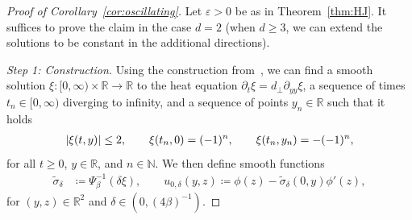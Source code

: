 \documentclass[12pt,oneside,a4paper,reqno]{amsart}
\numberwithin{equation}{section}
\theoremstyle{definition}
\theoremstyle{remark}
\newcommand{\bbN}{{\mathbb N}}
\newcommand{\bbR}{{\mathbb R}}
\DeclarePairedDelimiter{\abs}{\lvert}{\rvert}
\begin{document}
\begin{proof}[Proof of Corollary~\ref{cor:oscillating}]
    Let $\varepsilon > 0$ be as in Theorem~\ref{thm:HJ}. It suffices to prove the claim in the case $d = 2$ (when $d \geq 3$, we can extend the solutions to be constant in the additional directions).
    
    \emph{Step 1: Construction.}
    Using the construction from~\cite[\S\,3]{matano_stability_2009}, we can find a smooth solution $\xi \colon [0,\infty) \times \bbR \to \bbR$ to the heat equation $\partial_t \xi = d_{\bot} \partial_{yy}\xi$,
    a sequence of times $t_n \in [0,\infty)$ diverging to infinity, and a sequence of points $y_n \in \bbR$ such that it holds
    \begin{align*}
    \abs{\xi(t,y)} \leq 2, 
    \qquad \xi(t_n,0) = (-1)^{n},
    \qquad \xi(t_n,y_n) = - (-1)^{n},
    \end{align*}
    for all $t \geq 0$, $y \in \bbR$, and $n \in \bbN$.
    We then define smooth functions
    \begin{align*}
        \tilde{\sigma}_{\delta} &\coloneq \Psi_\beta^{-1}(\delta \xi), \qquad 
        u_{0,\delta}(y,z) \coloneq \phi(z) - \tilde\sigma_{\delta}(0,y)\phi'(z),
    \end{align*}
    for $(y,z) \in \bbR^2$ and $\delta \in (0,(4\beta)^{-1})$.
    

\end{proof}
\end{document}
